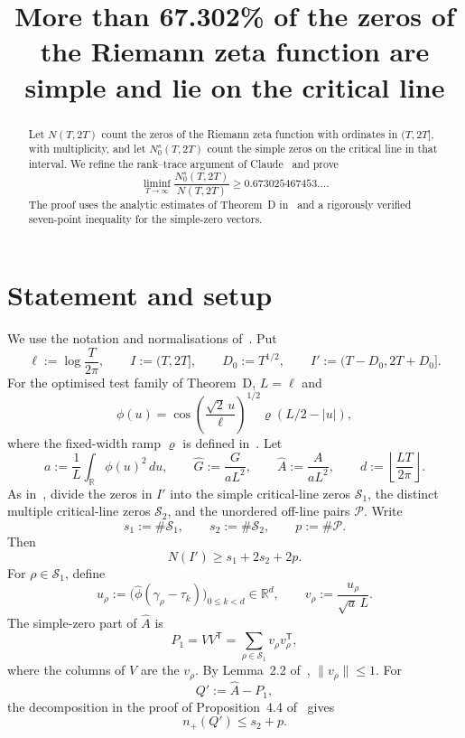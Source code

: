 \documentclass[11pt]{article}
\title{More than 67.302\% of the zeros of the Riemann zeta function are simple and lie on the critical line}
\date{}
\newcommand{\R}{\mathbb R}
\newcommand{\cS}{\mathcal S}
\newcommand{\cP}{\mathcal P}
\begin{document}
\maketitle

\begin{abstract}
Let $N(T,2T)$ count the zeros of the Riemann zeta function with ordinates in
$(T,2T]$, with multiplicity, and let $N_0^s(T,2T)$ count the simple zeros on
the critical line in that interval.  We refine the rank--trace argument of
Claude~\cite{Claude26} and prove
\[
 \liminf_{T\to\infty}\frac{N_0^s(T,2T)}{N(T,2T)}
 \ge 0.673025467453\ldots .
\]
The proof uses the analytic estimates of Theorem~D in~\cite{Claude26} and a
rigorously verified seven-point inequality for the simple-zero vectors.
\end{abstract}

\section{Statement and setup}

We use the notation and normalisations of~\cite[\S\S2,4,7.1]{Claude26}.  Put
\[
 \ell:=\log\frac{T}{2\pi},\qquad I:=(T,2T],\qquad
 D_0:=T^{1/2},\qquad I':=(T-D_0,2T+D_0].
\]
For the optimised test family of Theorem~D, $L=\ell$ and
\[
 \phi(u)=\cos\!\left(\frac{\sqrt2\,u}{\ell}\right)^{1/2}
 \varrho(L/2-|u|),
\]
where the fixed-width ramp $\varrho$ is defined in~\cite[\S2.2]{Claude26}.
Let
\[
 a:=\frac1L\int_{\R}\phi(u)^2\,du,
 \qquad \widehat G:=\frac{G}{aL^2},
 \qquad \widehat A:=\frac{A}{aL^2},
 \qquad d:=\left\lfloor\frac{LT}{2\pi}\right\rfloor.
\]
As in~\cite[\S4.1]{Claude26}, divide the zeros in $I'$ into the simple
critical-line zeros $\cS_1$, the distinct multiple critical-line zeros
$\cS_2$, and the unordered off-line pairs $\cP$.  Write
\[
 s_1:=\#\cS_1,\qquad s_2:=\#\cS_2,\qquad p:=\#\cP.
\]
Then
\begin{equation}\label{eq:Nlower}
 N(I')\ge s_1+2s_2+2p.
\end{equation}
For $\rho\in\cS_1$, define
\[
 u_\rho:=\bigl(\widehat\phi(\gamma_\rho-\tau_k)\bigr)_{0\le k<d}
 \in\R^d,
 \qquad
 v_\rho:=\frac{u_\rho}{\sqrt a\,L}.
\]
The simple-zero part of $\widehat A$ is
\[
 P_1=VV^{\mathsf T}=\sum_{\rho\in\cS_1}v_\rho v_\rho^{\mathsf T},
\]
where the columns of $V$ are the $v_\rho$.  By Lemma~2.2
of~\cite{Claude26}, $\|v_\rho\|\le1$.  For
\[
 Q':=\widehat A-P_1,
\]
the decomposition in the proof of Proposition~4.4 of~\cite{Claude26} gives
\begin{equation}\label{eq:index}
 n_+(Q')\le s_2+p.
\end{equation}
\end{document}
